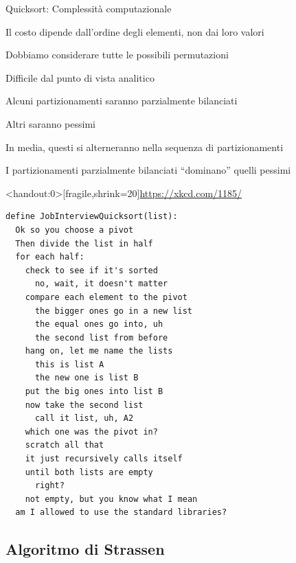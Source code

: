 \begin{frame}{Quicksort: Complessità computazionale}
\BIL
\item Il costo dipende dall'ordine degli elementi, non dai loro valori
\item Dobbiamo considerare tutte le possibili permutazioni
\item Difficile dal punto di vista analitico
\EIL

\BIL
\item Alcuni partizionamenti saranno parzialmente bilanciati
\item Altri saranno pessimi
\item In media, questi si alterneranno nella sequenza di partizionamenti
\item I partizionamenti parzialmente bilanciati “dominano” quelli pessimi
\EIL
\end{frame}


\begin{frame}<handout:0>[fragile,shrink=20]{\url{https://xkcd.com/1185/}}
\vspace{-12pt}
\begin{lstlisting}
define JobInterviewQuicksort(list):
  Ok so you choose a pivot
  Then divide the list in half
  for each half:
    check to see if it's sorted
      no, wait, it doesn't matter
    compare each element to the pivot
      the bigger ones go in a new list
      the equal ones go into, uh
      the second list from before
    hang on, let me name the lists
      this is list A
      the new one is list B
    put the big ones into list B
    now take the second list
      call it list, uh, A2
    which one was the pivot in?
    scratch all that
    it just recursively calls itself
    until both lists are empty
      right?
    not empty, but you know what I mean
  am I allowed to use the standard libraries?
\end{lstlisting}

\end{frame}



\subsection{Algoritmo di Strassen}

